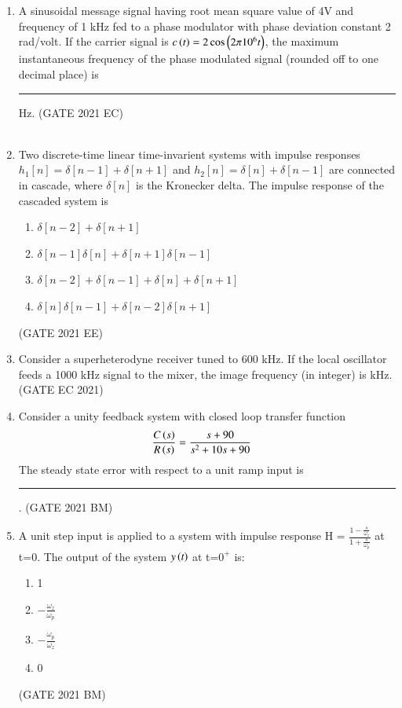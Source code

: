 \begin{enumerate}[label=\thechapter.\arabic*,ref=\thechapter.\theenumi]
\item A sinusoidal message signal having root mean square value of 4V and frequency of 1 kHz fed to a phase modulator with phase deviation constant 2 rad/volt. If the carrier signal is $c\left(t\right) = 2\cos \left(2\pi 10^6 t\right)$, the maximum instantaneous frequency of the phase modulated signal (rounded off to one decimal place) is \rule{1cm}{0.05mm} Hz. \hfill(GATE 2021 EC)\\
\solution\\

\pagebreak
\item Two discrete-time linear time-invarient systems with impulse responses $h_1[n]=\delta[n-1]+\delta[n+1]$ and $h_2[n]=\delta[n]+\delta[n-1]$ are connected in cascade, where $\delta[n]$ is the Kronecker delta. The impulse response of the cascaded system is   \\
\begin{enumerate}[label=(\alph*)]
    \item $\delta[n-2]+\delta[n+1]$
    \item $\delta[n-1]\delta[n]+\delta[n+1]\delta[n-1]$
    \item $\delta[n-2]+\delta[n-1]+\delta[n]+\delta[n+1]$
    \item $\delta[n]\delta[n-1]+\delta[n-2]\delta[n+1]$
\end{enumerate} \hfill(GATE 2021 EE)\\
\solution

\pagebreak
\item Consider a superheterodyne receiver tuned to 600 kHz. If the local oscillator feeds a 1000 kHz signal to the mixer, the image frequency (in integer) is \underline{\hspace{1cm}} kHz.
\hfill(GATE EC 2021)\\
\solution

\pagebreak
\item Consider a unity feedback system with closed loop transfer function
\begin{align*}
\frac{C\left(s\right)}{R\left(s\right)} &= \frac{s + 90}{s^2 + 10s + 90}
\end{align*}
The steady state error with respect to a unit ramp input is \rule{1cm}{0.15mm} .
\hfill(GATE 2021 BM) \\
\solution

\item A unit step input is applied to a system with impulse response H = $\frac{1- \frac{s}{\omega{_z}}}{1+\frac{s}{\omega{_p}}}$ at t=0. The output of the system $y\left(t\right)$ at t=$0^+$ is:
\begin{enumerate}[label=\alph*)]
 \item 1
 \item $-\frac{\omega{_z}}{\omega{_p}}$
 \item $-\frac{\omega{_p}}{\omega{_z}}$
 \item 0
\end{enumerate} \hfill(GATE 2021 BM)\\
\solution



\end{enumerate}
